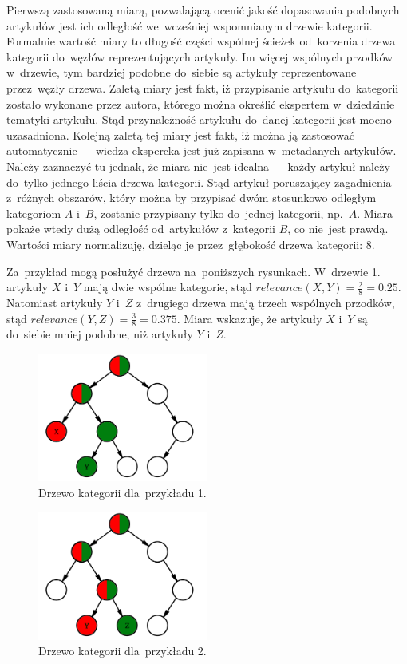 \documentclass[pl]{minipw} %
\begin{document}
Pierwszą zastosowaną miarą, pozwalającą ocenić jakość dopasowania podobnych artykułów jest ich odległość we~wcześniej wspomnianym drzewie kategorii. Formalnie wartość miary to długość części wspólnej ścieżek od~korzenia drzewa kategorii do~węzłów reprezentujących artykuły. Im więcej wspólnych przodków w~drzewie, tym bardziej podobne do~siebie są artykuły reprezentowane przez~węzły drzewa. Zaletą miary jest fakt, iż przypisanie artykułu do~kategorii zostało wykonane przez autora, którego można określić ekspertem w~dziedzinie tematyki artykułu. Stąd przynależność artykułu do~danej kategorii jest mocno uzasadniona. Kolejną zaletą tej miary jest fakt, iż można ją zastosować automatycznie --- wiedza ekspercka jest już zapisana w~metadanych artykułów. Należy zaznaczyć tu jednak, że miara nie~jest idealna --- każdy artykuł należy do~tylko jednego liścia drzewa kategorii. Stąd artykuł poruszający zagadnienia z~różnych obszarów, który można by przypisać dwóm stosunkowo odległym kategoriom $A$ i~$B$, zostanie przypisany tylko do~jednej kategorii, np.~$A$. Miara pokaże wtedy dużą odległość od~artykułów z~kategorii $B$, co nie~jest prawdą. Wartości miary normalizuję, dzieląc je przez~głębokość drzewa kategorii: 8.

Za~przykład mogą posłużyć drzewa na~poniższych rysunkach. W~drzewie 1. artykuły $X$ i~$Y$ mają dwie wspólne kategorie, stąd $relevance(X, Y) = \frac{2}{8} = 0.25$. Natomiast artykuły $Y$ i~$Z$ z~drugiego drzewa mają trzech wspólnych przodków, stąd $relevance(Y, Z)=\frac{3}{8} = 0.375$. Miara wskazuje, że artykuły $X$ i~$Y$ są do~siebie mniej podobne, niż artykuły $Y$ i~$Z$.

\begin{figure}[H]
	\centering
	\includegraphics[width=0.5\textwidth]{img/cat_tree_example_1.png}
	\caption{Drzewo kategorii dla~przykładu 1.}
\end{figure}
\begin{figure}[H]
	\centering
	\includegraphics[width=0.5\textwidth]{img/cat_tree_example_2.png}
	\caption{Drzewo kategorii dla~przykładu 2.}
	\label{fig:warstwy}
\end{figure}
\end{document}
